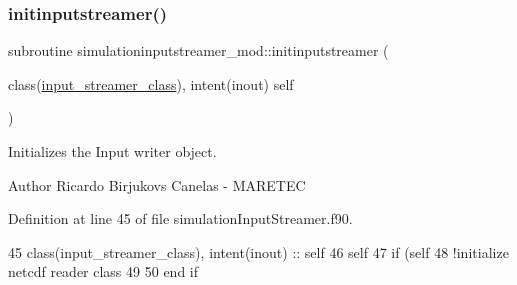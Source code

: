 \subsubsection{\texorpdfstring{initinputstreamer()}{initinputstreamer()}}
{\footnotesize\ttfamily subroutine simulationinputstreamer\+\_\+mod\+::initinputstreamer (\begin{DoxyParamCaption}\item[{class(\mbox{\hyperlink{structsimulationinputstreamer__mod_1_1input__streamer__class}{input\+\_\+streamer\+\_\+class}}), intent(inout)}]{self }\end{DoxyParamCaption})\hspace{0.3cm}{\ttfamily [private]}}



Initializes the Input writer object. 

\begin{DoxyAuthor}{Author}
Ricardo Birjukovs Canelas -\/ M\+A\+R\+E\+T\+EC 
\end{DoxyAuthor}


Definition at line 45 of file simulation\+Input\+Streamer.\+f90.


\begin{DoxyCode}
45     \textcolor{keywordtype}{class}(input\_streamer\_class), \textcolor{keywordtype}{intent(inout)} :: self
46     self%
47     \textcolor{keywordflow}{if} (self%
48         \textcolor{comment}{!initialize netcdf reader class}
49 
50 \textcolor{keywordflow}{    end if}
\end{DoxyCode}
